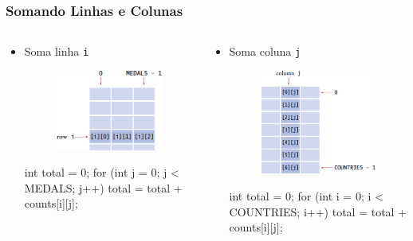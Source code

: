 \documentclass[xcolor={dvipsnames,table},aspectratio=169]{beamer}
\begin{document}
\begin{frame}[fragile]\frametitle{Somando Linhas e Colunas}
\begin{columns}[T]
	\begin{column}{0.5\linewidth}
\begin{itemize}
	\item Soma linha \texttt{i}
\begin{figure}[h]
	\includegraphics[height=0.3\paperheight,center]{pucrs-ep-fprog-unidade_06-arrays-laminas-array_2d_somando_linhas.png}
\end{figure}
{\scriptsize
\begin{javacode}
int total = 0;
for (int j = 0; j < MEDALS; j++) {
  total = total + counts[i][j];
}
\end{javacode}
}
\end{itemize}
	\end{column}
	\begin{column}{0.5\linewidth}
\begin{itemize}
	\item Soma coluna \texttt{j}
\begin{figure}[h]
	\includegraphics[height=0.4\paperheight,center]{pucrs-ep-fprog-unidade_06-arrays-laminas-array_2d_somando_colunas.png}
\end{figure}
{\scriptsize
\begin{javacode}
int total = 0;
for (int i = 0; i < COUNTRIES; i++) {
  total = total + counts[i][j];
}
\end{javacode}
}
\end{itemize}
	\end{column}
\end{columns}
\end{frame}
\end{document}
